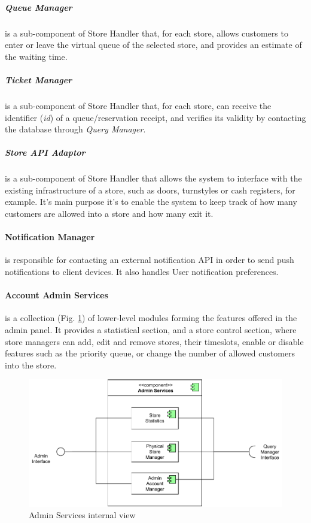 \subparagraph{Queue Manager} is a sub-component of Store Handler that, for each store, allows customers to enter or leave the virtual queue of the selected store, and provides an estimate of the waiting time.

\subparagraph{Ticket Manager} is a sub-component of Store Handler that, for each store, can receive the identifier (\emph{id}) of a queue/reservation receipt, and verifies its validity by contacting the database through \emph{Query Manager}.

\subparagraph{Store API Adaptor} is a sub-component of Store Handler that allows the system to interface with the existing infrastructure of a store, such as doors, turnstyles or cash registers, for example. It's main purpose it's to enable the system to keep track of how many customers are allowed into a store and how many exit it.

\paragraph{Notification Manager} is responsible for contacting an external notification API in order to send push notifications to client devices. It also handles User notification preferences.

\paragraph{Account Admin Services} is a collection (Fig. \ref{fig:admin_services}) of lower-level modules forming the features offered in the admin panel. It provides a statistical section, and a store control section, where store managers can add, edit and remove stores, their timeslots, enable or disable features such as the priority queue, or change the number of allowed customers into the store.

\begin{figure}[H]
    \centering
    \includegraphics[width=0.8\linewidth]{images/draw.io/admin_services.pdf}
    \caption{Admin Services internal view}
    \label{fig:admin_services}
\end{figure}

